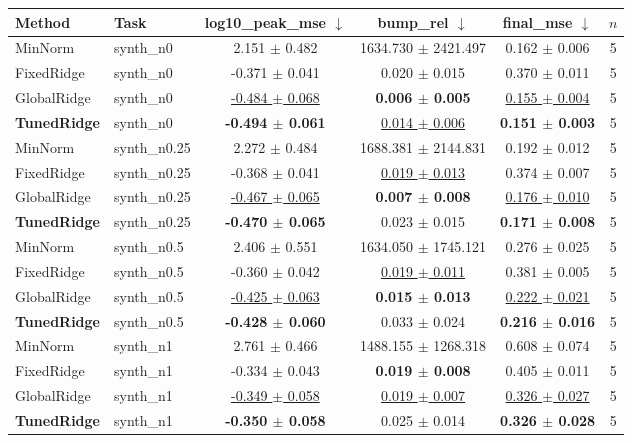 \begin{tabular}{llcccc}
\toprule
Method & Task & log10\_peak\_mse $\downarrow$ & bump\_rel $\downarrow$ & final\_mse $\downarrow$ & $n$ \\
\midrule
MinNorm & synth\_n0 & 2.151 $\pm$ 0.482 & 1634.730 $\pm$ 2421.497 & 0.162 $\pm$ 0.006 & 5 \\
FixedRidge & synth\_n0 & -0.371 $\pm$ 0.041 & 0.020 $\pm$ 0.015 & 0.370 $\pm$ 0.011 & 5 \\
GlobalRidge & synth\_n0 & \underline{-0.484 $\pm$ 0.068} & \textbf{0.006 $\pm$ 0.005} & \underline{0.155 $\pm$ 0.004} & 5 \\
\textbf{TunedRidge} & synth\_n0 & \textbf{-0.494 $\pm$ 0.061} & \underline{0.014 $\pm$ 0.006} & \textbf{0.151 $\pm$ 0.003} & 5 \\
\midrule
MinNorm & synth\_n0.25 & 2.272 $\pm$ 0.484 & 1688.381 $\pm$ 2144.831 & 0.192 $\pm$ 0.012 & 5 \\
FixedRidge & synth\_n0.25 & -0.368 $\pm$ 0.041 & \underline{0.019 $\pm$ 0.013} & 0.374 $\pm$ 0.007 & 5 \\
GlobalRidge & synth\_n0.25 & \underline{-0.467 $\pm$ 0.065} & \textbf{0.007 $\pm$ 0.008} & \underline{0.176 $\pm$ 0.010} & 5 \\
\textbf{TunedRidge} & synth\_n0.25 & \textbf{-0.470 $\pm$ 0.065} & 0.023 $\pm$ 0.015 & \textbf{0.171 $\pm$ 0.008} & 5 \\
\midrule
MinNorm & synth\_n0.5 & 2.406 $\pm$ 0.551 & 1634.050 $\pm$ 1745.121 & 0.276 $\pm$ 0.025 & 5 \\
FixedRidge & synth\_n0.5 & -0.360 $\pm$ 0.042 & \underline{0.019 $\pm$ 0.011} & 0.381 $\pm$ 0.005 & 5 \\
GlobalRidge & synth\_n0.5 & \underline{-0.425 $\pm$ 0.063} & \textbf{0.015 $\pm$ 0.013} & \underline{0.222 $\pm$ 0.021} & 5 \\
\textbf{TunedRidge} & synth\_n0.5 & \textbf{-0.428 $\pm$ 0.060} & 0.033 $\pm$ 0.024 & \textbf{0.216 $\pm$ 0.016} & 5 \\
\midrule
MinNorm & synth\_n1 & 2.761 $\pm$ 0.466 & 1488.155 $\pm$ 1268.318 & 0.608 $\pm$ 0.074 & 5 \\
FixedRidge & synth\_n1 & -0.334 $\pm$ 0.043 & \textbf{0.019 $\pm$ 0.008} & 0.405 $\pm$ 0.011 & 5 \\
GlobalRidge & synth\_n1 & \underline{-0.349 $\pm$ 0.058} & \underline{0.019 $\pm$ 0.007} & \underline{0.326 $\pm$ 0.027} & 5 \\
\textbf{TunedRidge} & synth\_n1 & \textbf{-0.350 $\pm$ 0.058} & 0.025 $\pm$ 0.014 & \textbf{0.326 $\pm$ 0.028} & 5 \\

\end{tabular}
